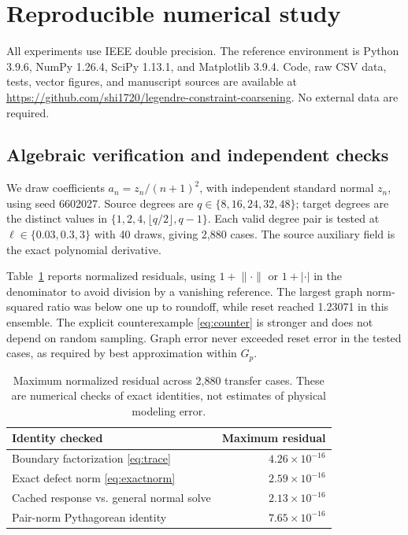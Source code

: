\documentclass[11pt]{article}
\newcommand{\norm}[1]{\lVert #1\rVert}
\begin{document}
\section{Reproducible numerical study}
All experiments use IEEE double precision. The reference environment is Python 3.9.6, NumPy 1.26.4, SciPy 1.13.1, and Matplotlib 3.9.4. Code, raw CSV data, tests, vector figures, and manuscript sources are available at \url{https://github.com/shi1720/legendre-constraint-coarsening}. No external data are required.

\subsection{Algebraic verification and independent checks}
We draw coefficients \(a_n=z_n/(n+1)^2\), with independent standard normal \(z_n\), using seed 6602027. Source degrees are \(q\in\{8,16,24,32,48\}\); target degrees are the distinct values in \(\{1,2,4,\lfloor q/2\rfloor,q-1\}\). Each valid degree pair is tested at \(\ell\in\{0.03,0.3,3\}\) with 40 draws, giving 2,880 cases. The source auxiliary field is the exact polynomial derivative.

Table~\ref{tab:algebra} reports normalized residuals, using \(1+\norm{\cdot}\) or \(1+|\cdot|\) in the denominator to avoid division by a vanishing reference. The largest graph norm-squared ratio was below one up to roundoff, while reset reached 1.23071 in this ensemble. The explicit counterexample \eqref{eq:counter} is stronger and does not depend on random sampling. Graph error never exceeded reset error in the tested cases, as required by best approximation within \(G_p\).

\begin{table}[t]\centering
\caption{Maximum normalized residual across 2,880 transfer cases. These are numerical checks of exact identities, not estimates of physical modeling error.}\label{tab:algebra}
\begin{tabular}{lr}\toprule
Identity checked & Maximum residual\\\midrule
Boundary factorization \eqref{eq:trace} & \(4.26\times10^{-16}\)\\
Exact defect norm \eqref{eq:exactnorm} & \(2.59\times10^{-16}\)\\
Cached response vs. general normal solve & \(2.13\times10^{-16}\)\\
Pair-norm Pythagorean identity & \(7.65\times10^{-16}\)\\\bottomrule
\end{tabular}
\end{table}
\end{document}
